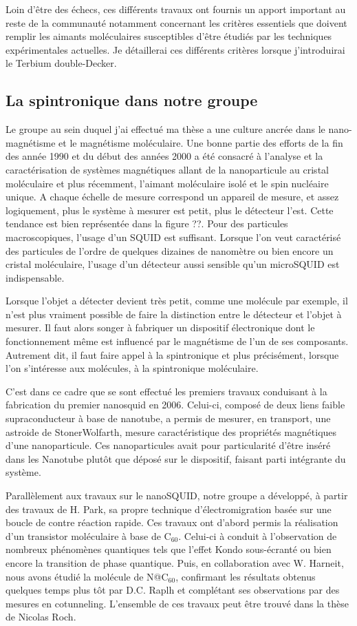 Loin d'\^etre des échecs, ces différents travaux ont fournis un apport important au reste de la communauté notamment concernant les critères essentiels que doivent remplir les aimants moléculaires susceptibles d'être étudiés par les techniques expérimentales actuelles. Je détaillerai ces différents critères lorsque j'introduirai le Terbium double-Decker.
 
\subsection{La spintronique dans notre groupe}
Le groupe au sein duquel j'ai effectué ma thèse a une culture ancrée dans le nano-magnétisme et le magnétisme moléculaire. Une bonne partie des efforts de la fin des année 1990 et du début des années 2000 a été consacré à l'analyse et la caractérisation de systèmes magnétiques allant de la nanoparticule au cristal moléculaire  et plus récemment, l'aimant moléculaire isolé et le spin nucléaire unique. A chaque échelle de mesure correspond un appareil de mesure, et assez logiquement, plus le système à mesurer est petit, plus le détecteur l'est. Cette tendance est bien représentée dans la figure ??. Pour des particules macroscopiques, l'usage d'un SQUID est suffisant. Lorsque l'on veut caractérisé des particules de l'ordre de quelques dizaines de nanomètre ou bien encore un cristal moléculaire, l'usage d'un détecteur aussi sensible qu'un microSQUID est indispensable.

Lorsque l'objet a détecter devient très petit, comme une molécule par exemple, il n'est plus vraiment possible de faire la distinction entre le détecteur et l'objet à mesurer. Il faut alors songer à fabriquer un dispositif électronique dont le fonctionnement même est influencé par le magnétisme de l'un de ses composants. Autrement dit, il faut faire appel à la spintronique et plus précisément, lorsque l'on s'intéresse aux molécules, à la spintronique moléculaire.

C'est dans ce cadre que se sont effectué les premiers travaux conduisant à la fabrication du premier nanosquid en 2006. Celui-ci,  composé de deux liens faible supraconducteur à base de nanotube, a permis de mesurer, en transport, une astroide de StonerWolfarth, mesure caractéristique des propriétés magnétiques d'une nanoparticule. Ces nanoparticules avait pour particularité d'être inséré dans les Nanotube plutôt que déposé sur le dispositif, faisant parti intégrante du système.

Parallèlement aux travaux sur le nanoSQUID, notre groupe a développé, à partir des travaux de H. Park, sa propre technique d'électromigration basée sur une boucle de contre réaction rapide. Ces travaux ont d'abord permis la réalisation d'un transistor moléculaire à base de C$_{60}$. Celui-ci à conduit à l'observation de nombreux phénomènes quantiques tels que l'effet Kondo sous-écranté ou bien encore la transition de phase quantique. Puis, en collaboration avec W. Harneit, nous avons étudié la molécule de N@C$_{60}$, confirmant les résultats obtenus quelques temps plus tôt par D.C. Raplh et complétant ses observations par des mesures en cotunneling. L'ensemble de ces travaux peut être trouvé dans la thèse de Nicolas Roch.

